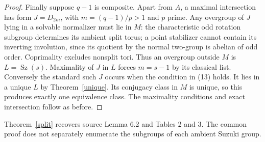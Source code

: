 \documentclass[11pt,a4paper]{article}
\newcommand{\Sz}{\operatorname{Sz}}
\begin{document}
\begin{proof}
Finally suppose $q-1$ is composite. Apart from $A$, a maximal
intersection has form $J=D_{2m}$, with $m=(q-1)/p>1$ and $p$
prime. Any overgroup of $J$ lying in a solvable normalizer must
lie in $M$: the characteristic odd rotation subgroup determines
its ambient split torus; a point stabilizer cannot contain its
inverting involution, since its quotient by the normal two-group
is abelian of odd order. Coprimality excludes nonsplit tori.
Thus an overgroup outside $M$ is $L=\Sz(s)$. Maximality of
$J$ in $L$ forces $m=s-1$ by its classical list. Conversely
the standard such $J$ occurs when the condition in (13) holds.
It lies in a unique $L$ by Theorem~\ref{unique}. Its conjugacy
class in $M$ is unique, so this produces exactly one equivalence
class. The maximality conditions and exact intersection follow
as before.
\end{proof}

Theorem~\ref{split} recovers source Lemma 6.2 and Tables 2 and 3.
The common proof does not separately enumerate the subgroups of
each ambient Suzuki group.
\end{document}

